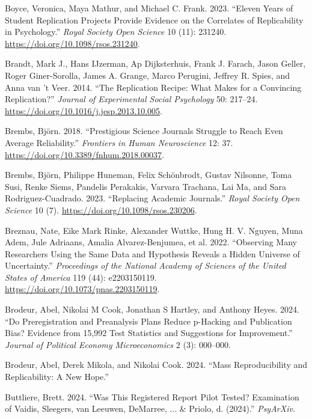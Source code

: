 \documentclass[
  letterpaper,
  DIV=11,
  numbers=noendperiod]{scrreprt}
\newlength{\cslhangindent}
\newenvironment{CSLReferences}[2] %
 {\begin{list}{}{%
  \setlength{\itemindent}{0pt}
  \setlength{\leftmargin}{0pt}
  \setlength{\parsep}{0pt}
  \ifodd #1
   \setlength{\leftmargin}{\cslhangindent}
   \setlength{\itemindent}{-1\cslhangindent}
  \fi
  \setlength{\itemsep}{#2\baselineskip}}}
 {\end{list}}
\begin{document}
\begin{CSLReferences}{1}{0}
Boyce, Veronica, Maya Mathur, and Michael C. Frank. 2023. {``Eleven
Years of Student Replication Projects Provide Evidence on the Correlates
of Replicability in Psychology.''} \emph{Royal Society Open Science} 10
(11): 231240. \url{https://doi.org/10.1098/rsos.231240}.

Brandt, Mark J., Hans IJzerman, Ap Dijksterhuis, Frank J. Farach, Jason
Geller, Roger Giner-Sorolla, James A. Grange, Marco Perugini, Jeffrey R.
Spies, and Anna van 't Veer. 2014. {``The Replication Recipe: What Makes
for a Convincing Replication?''} \emph{Journal of Experimental Social
Psychology} 50: 217--24.
\url{https://doi.org/10.1016/j.jesp.2013.10.005}.

Brembs, Björn. 2018. {``Prestigious Science Journals Struggle to Reach
Even Average Reliability.''} \emph{Frontiers in Human Neuroscience} 12:
37. \url{https://doi.org/10.3389/fnhum.2018.00037}.

Brembs, Björn, Philippe Huneman, Felix Schönbrodt, Gustav Nilsonne, Toma
Susi, Renke Siems, Pandelis Perakakis, Varvara Trachana, Lai Ma, and
Sara Rodriguez-Cuadrado. 2023. {``Replacing Academic Journals.''}
\emph{Royal Society Open Science} 10 (7).
\url{https://doi.org/10.1098/rsos.230206}.

Breznau, Nate, Eike Mark Rinke, Alexander Wuttke, Hung H. V. Nguyen,
Muna Adem, Jule Adriaans, Amalia Alvarez-Benjumea, et al. 2022.
{``Observing Many Researchers Using the Same Data and Hypothesis Reveals
a Hidden Universe of Uncertainty.''} \emph{Proceedings of the National
Academy of Sciences of the United States of America} 119 (44):
e2203150119. \url{https://doi.org/10.1073/pnas.2203150119}.

Brodeur, Abel, Nikolai M Cook, Jonathan S Hartley, and Anthony Heyes.
2024. {``Do Preregistration and Preanalysis Plans Reduce p-Hacking and
Publication Bias? Evidence from 15,992 Test Statistics and Suggestions
for Improvement.''} \emph{Journal of Political Economy Microeconomics} 2
(3): 000--000.

Brodeur, Abel, Derek Mikola, and Nikolai Cook. 2024. {``Mass
Reproducibility and Replicability: A New Hope.''}

Buttliere, Brett. 2024. {``Was This Registered Report Pilot Tested?
Examination of Vaidis, Sleegers, van Leeuwen, {DeMarree}, ... \& Priolo,
d. (2024).''} \emph{PsyArXiv}.


\end{CSLReferences}
\end{document}
